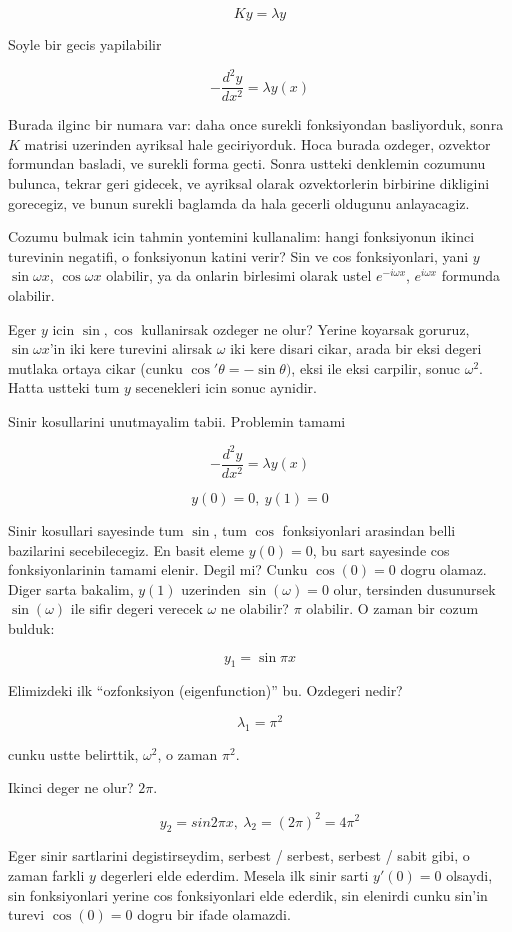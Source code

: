 \documentclass[12pt,fleqn]{article}\usepackage{../common}
\begin{document}
\[ Ky = \lambda y \]

Soyle bir gecis yapilabilir

\[ -\frac{d^2y}{dx^2} = \lambda y(x) \]

Burada ilginc bir numara var: daha once surekli fonksiyondan basliyorduk,
sonra $K$ matrisi uzerinden ayriksal hale geciriyorduk. Hoca burada
ozdeger, ozvektor formundan basladi, ve surekli forma gecti. Sonra ustteki
denklemin cozumunu bulunca, tekrar geri gidecek, ve ayriksal olarak
ozvektorlerin birbirine dikligini gorecegiz, ve bunun surekli baglamda da
hala gecerli oldugunu anlayacagiz. 

Cozumu bulmak icin tahmin yontemini kullanalim: hangi fonksiyonun ikinci
turevinin negatifi, o fonksiyonun katini verir? Sin ve cos fonksiyonlari,
yani $y$ $\sin \omega x$, $\cos \omega x$ olabilir, ya da onlarin birlesimi
olarak ustel $e^{-i\omega x}$, $e^{i\omega x}$ formunda olabilir.

Eger $y$ icin $\sin, \cos$ kullanirsak ozdeger ne olur? Yerine koyarsak
goruruz, $\sin\omega x$'in iki kere turevini alirsak $\omega$ iki kere
disari cikar, arada bir eksi degeri mutlaka ortaya cikar (cunku 
$\cos'\theta = -\sin\theta)$, eksi ile eksi carpilir, sonuc $\omega^2$. 
Hatta ustteki tum $y$ secenekleri icin sonuc aynidir. 
 
Sinir kosullarini unutmayalim tabii. Problemin tamami

\[ -\frac{d^2y}{dx^2} = \lambda y(x) \]

\[ y(0) = 0, \ y(1) = 0 \]

Sinir kosullari sayesinde tum $\sin$, tum $\cos$ fonksiyonlari arasindan belli
bazilarini secebilecegiz. En basit eleme $y(0) = 0$, bu sart sayesinde cos
fonksiyonlarinin tamami elenir. Degil mi? Cunku $\cos(0) = 0$ dogru
olamaz. Diger sarta bakalim, $y(1)$ uzerinden $\sin(\omega) = 0$ olur,
tersinden dusunursek $\sin(\omega)$ ile sifir degeri verecek $\omega$ ne
olabilir? $\pi$ olabilir. O zaman bir cozum bulduk:

\[ y_1 = \sin \pi x \]

Elimizdeki ilk ``ozfonksiyon (eigenfunction)'' bu. Ozdegeri nedir?

\[ \lambda_1 = \pi^2 \]

cunku ustte belirttik, $\omega^2$, o zaman $\pi^2$. 

Ikinci deger ne olur? $2\pi$. 

\[ y_2 = sin2\pi x, \ \lambda_2 = (2\pi)^2 = 4\pi^2 \]

Eger sinir sartlarini degistirseydim, serbest / serbest, serbest / sabit
gibi, o zaman farkli $y$ degerleri elde ederdim. Mesela ilk sinir sarti
$y'(0) = 0$ olsaydi, sin fonksiyonlari yerine cos fonksiyonlari elde
ederdik, sin elenirdi cunku sin'in turevi $\cos(0) = 0$ dogru bir ifade
olamazdi. 
\end{document}
